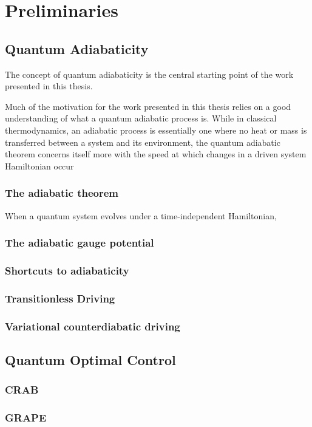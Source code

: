 \chapter{Preliminaries}
    \section{Quantum Adiabaticity}
        The concept of quantum adiabaticity is the central starting point of the work presented in this thesis. 
        
        Much of the motivation for the work presented in this thesis relies on a good understanding of what a quantum adiabatic process is. While in classical thermodynamics, an adiabatic process is essentially one where no heat or mass is transferred between a system and its environment, the quantum adiabatic theorem concerns itself more with the speed at which changes in a driven system Hamiltonian occur
        \subsection{The adiabatic theorem}
        When a quantum system evolves under a time-independent Hamiltonian, 
        \subsection{The adiabatic gauge potential}
        \subsection{Shortcuts to adiabaticity}
        \subsection{Transitionless Driving}
        \subsection{Variational counterdiabatic driving}
    \section{Quantum Optimal Control}
        \subsection{CRAB}
        \subsection{GRAPE}